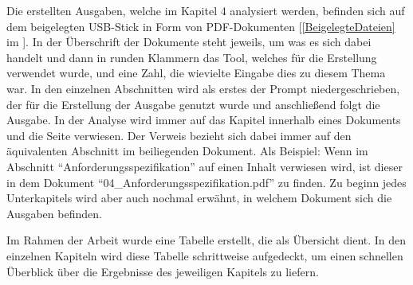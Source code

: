 Die erstellten Ausgaben, welche im Kapitel 4 analysiert werden, befinden sich auf dem beigelegten USB-Stick 
in Form von PDF-Dokumenten [\autoref{BeigelegteDateien} im ]. In der Überschrift der Dokumente steht jeweils, 
um was es sich dabei handelt und dann in runden Klammern das Tool, welches für die Erstellung verwendet 
wurde, und eine Zahl, die wievielte Eingabe dies zu diesem Thema war. In den einzelnen Abschnitten wird als erstes der 
Prompt niedergeschrieben, der für die Erstellung der Ausgabe genutzt wurde und anschließend folgt die Ausgabe. In der Analyse wird immer auf 
das Kapitel innerhalb eines Dokuments und die Seite verwiesen. Der Verweis bezieht sich dabei immer auf 
den äquivalenten Abschnitt im beiliegenden Dokument. Als Beispiel: Wenn im Abschnitt ``Anforderungsspezifikation'' auf einen Inhalt verwiesen wird, 
ist dieser in dem Dokument ``04\_Anforderungsspezifikation.pdf'' zu finden. Zu beginn jedes Unterkapitels wird aber auch nochmal 
erwähnt, in welchem Dokument sich die Ausgaben befinden.

Im Rahmen der Arbeit wurde eine Tabelle erstellt, die als Übersicht dient. In den einzelnen Kapiteln wird diese Tabelle 
schrittweise aufgedeckt, um einen schnellen Überblick über die Ergebnisse des jeweiligen Kapitels zu liefern.